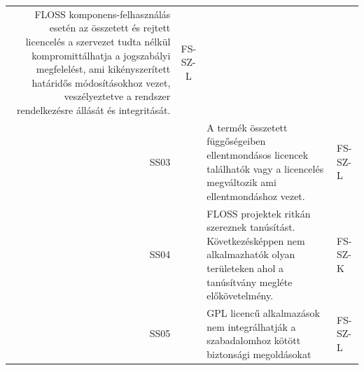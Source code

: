 \documentclass[12pt,magyar,a4paper,oneside]{scrreprt}
\begin{document}
\begin{longtable}[]{@{}rcll@{}}
\begin{minipage}[t]{0.69\columnwidth}
FLOSS komponens-felhasználás esetén az összetett és rejtett licencelés a
szervezet tudta nélkül kompromittálhatja a jogszabályi megfelelést, ami
kikényszerített határidős módosításokhoz vezet, veszélyeztetve a
rendszer rendelkezésre állását és integritását.\strut
\end{minipage} & \begin{minipage}[t]{0.13\columnwidth}\raggedright
FS-SZ-L\strut
\end{minipage}\tabularnewline
\begin{minipage}[t]{0.03\columnwidth}\raggedleft
SS03\strut
\end{minipage} & \begin{minipage}[t]{0.03\columnwidth}\centering
2\strut
\end{minipage} & \begin{minipage}[t]{0.69\columnwidth}\raggedright
A termék összetett függőségeiben ellentmondásos licencek találhatók vagy
a licencelés megváltozik ami ellentmondáshoz vezet.\strut
\end{minipage} & \begin{minipage}[t]{0.13\columnwidth}\raggedright
FS-SZ-L\strut
\end{minipage}\tabularnewline
\begin{minipage}[t]{0.03\columnwidth}\raggedleft
SS04\strut
\end{minipage} & \begin{minipage}[t]{0.03\columnwidth}\centering
2\strut
\end{minipage} & \begin{minipage}[t]{0.69\columnwidth}\raggedright
FLOSS projektek ritkán szereznek tanúsítást. Következésképpen nem
alkalmazhatók olyan területeken ahol a tanúsítvány megléte
előkövetelmény.\strut
\end{minipage} & \begin{minipage}[t]{0.13\columnwidth}\raggedright
FS-SZ-K\strut
\end{minipage}\tabularnewline
\begin{minipage}[t]{0.03\columnwidth}\raggedleft
SS05\strut
\end{minipage} & \begin{minipage}[t]{0.03\columnwidth}\centering
1\strut
\end{minipage} & \begin{minipage}[t]{0.69\columnwidth}\raggedright
GPL licencű alkalmazások nem integrálhatják a szabadalomhoz kötött
biztonsági megoldásokat\strut
\end{minipage} & \begin{minipage}[t]{0.13\columnwidth}\raggedright
FS-SZ-L\strut
\end{minipage}\tabularnewline
\bottomrule
\end{longtable}
\end{document}

